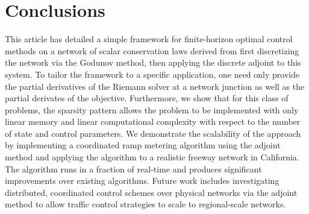 \section{Conclusions\label{sec:Conclusions}}

This article has detailed a simple framework for finite-horizon optimal control 
methods on a network of scalar conservation laws derived from first 
discretizing the network via the Godunov method, then applying the discrete 
adjoint to this system. To tailor the framework to a specific application, one 
need only provide the partial derivatives of the Riemann solver at a network 
junction as well as the partial derivates of the objective. Furthermore, we 
show that for this class of problems, the sparsity pattern allows the problem 
to be implemented with only linear memory and linear computational complexity 
with respect to the number of state and control parameters. We demonstrate the 
scalability of the approach by implementing a coordinated ramp metering 
algorithm using the adjoint method and applying the algorithm to a realistic 
freeway network in California. The algorithm runs in a fraction of real-time 
and produces significant improvements over existing algorithms. Future work 
includes investigating distributed, coordinated control schemes over physical 
networks via the adjoint method to allow traffic control strategies to scale to 
regional-scale networks.
